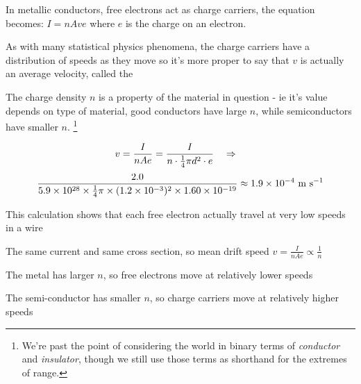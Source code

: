 In metallic conductors, free electrons act as charge carriers, the equation becomes: $I = nAve$ where $e$ is the charge on an electron.

As with many statistical physics phenomena, the charge carriers have a distribution of speeds as they move 
so it's more proper to say that $v$ is actually an average velocity, called the 

The charge density $n$ is a property of the material in question - ie it's value depends on type of material, good conductors have large $n$, while semiconductors have smaller $n$. \footnote{We're past the point of considering the world in binary terms of \emph{conductor} and \emph{insulator}, though we still use those terms as shorthand for the extremes of range.}



\begin{soln}\begin{equation*}
v = \frac{I}{nAe} = \frac{I}{n\cdot\frac{1}{4} \pi d^2 \cdot e} \quad \Rightarrow \quad \end{equation*}
\begin{equation*}\frac{2.0}{5.9\times10^{28} \times \frac{1}{4}\pi \times (1.2\times10^{-3})^2\times1.60\times10^{-19}} \approx 1.9\times10^{-4} \text{ m s$^{-1}$}
\end{equation*}

\eqyskip This calculation shows that each free electron actually travel at very low speeds in a wire \end{soln}


\begin{soln}
    
The same current and same cross section, so mean drift speed $ v = \frac{I}{nAe} \propto \frac{1}{n}$

The metal has larger $n$, so free electrons move at relatively lower speeds

The semi-conductor has smaller $n$, so charge carriers move at relatively higher speeds \end{soln}




